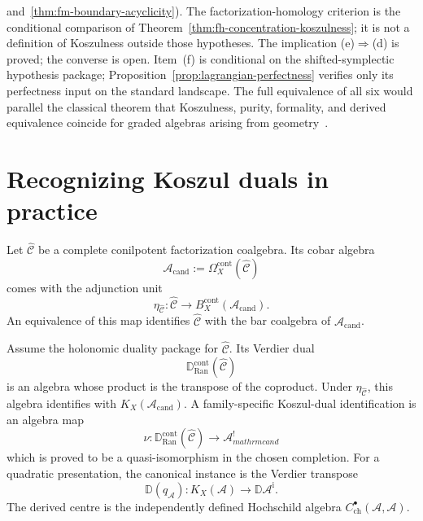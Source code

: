 \begin{remark}
and~\ref{thm:fm-boundary-acyclicity}\textup{)}. The factorization-homology
criterion is the conditional comparison of
Theorem~\ref{thm:fh-concentration-koszulness}; it is not a definition
of Koszulness outside those hypotheses.
The implication (e)$\Rightarrow$(d) is proved; the converse is open.
Item~(f) is conditional on the shifted-symplectic hypothesis package;
Proposition~\ref{prop:lagrangian-perfectness} verifies only its
perfectness input on the standard landscape.
The full equivalence of all six would parallel the classical theorem
that Koszulness, purity, formality, and derived equivalence coincide
for graded algebras arising from geometry~\cite{BGS96}.
\end{remark}


\section{Recognizing Koszul duals in practice}
\label{sec:recognizing-koszul-duals}

\begin{remark}\label{rem:identify-koszul-wild}
Let $\widehat{\mathcal C}$ be a complete conilpotent factorization
coalgebra.  Its cobar algebra
\[
\mathcal A_{\mathrm{cand}}:=\Omega_X^{\mathrm{cont}}
(\widehat{\mathcal C})
\]
comes with the adjunction unit
\[
\eta_{\widehat{\mathcal C}}\colon
\widehat{\mathcal C}\longrightarrow
B_X^{\mathrm{cont}}(\mathcal A_{\mathrm{cand}}).
\]
An equivalence of this map identifies $\widehat{\mathcal C}$ with the
bar coalgebra of $\mathcal A_{\mathrm{cand}}$.

Assume the holonomic duality package for
$\widehat{\mathcal C}$.  Its Verdier dual
\[
\mathbb D_{\operatorname{Ran}}^{\mathrm{cont}}
(\widehat{\mathcal C})
\]
is an algebra whose product is the transpose of the coproduct.  Under
$\eta_{\widehat{\mathcal C}}$, this algebra identifies with
$K_X(\mathcal A_{\mathrm{cand}})$.  A family-specific Koszul-dual
identification is an algebra map
\[
\nu\colon
\mathbb D_{\operatorname{Ran}}^{\mathrm{cont}}
(\widehat{\mathcal C})\longrightarrow\mathcal A^!_{mathrm{cand}}
\]
which is proved to be a quasi-isomorphism in the chosen completion.
For a quadratic presentation, the canonical instance is the Verdier
transpose
\[
\mathbb D(q_{\mathcal A})\colon
K_X(\mathcal A)\longrightarrow
\mathbb D\mathcal A^{\mathrm i}.
\]
The derived centre is the independently defined Hochschild algebra
$C^\bullet_{\mathrm{ch}}(\mathcal A,\mathcal A)$.
\end{remark}

